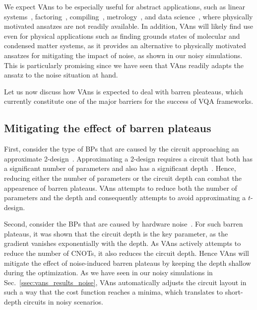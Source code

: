 We expect VAns to be especially useful for abstract applications, such as linear systems~\cite{bravo2020variational,huang2019near,xu2019variational}, factoring~\cite{anschuetz2019variational}, compiling~\cite{khatri2019quantum,sharma2019noise}, metrology~\cite{beckey2020variational,koczor2020variational}, and data science~\cite{larose2019variational,cerezo2020variational,biamonte2017quantum,schuld2014quest,abbas2020power,verdon2019quantum}, where physically motivated ansatzes are not readily available. In addition, VAns will likely find use even for physical applications such as finding grounds states of molecular and condensed matter systems, as it provides an alternative to physically motivated ansatzes for mitigating the impact of noise, as shown in our noisy simulations. This is particularly promising since we have seen that VAns readily adapts the ansatz to the noise situation at hand.

Let us now discuss how VAns is expected to deal with barren pleateaus, which currently constitute one of the major barriers for the success of VQA frameworks.

\subsection{Mitigating the effect of barren plateaus}
First, consider the type of BPs that are caused by the circuit approaching an approximate 2-design~\cite{mcclean2018barren}. Approximating a 2-design requires a circuit that both has a significant number of parameters and also has a significant depth~\cite{brandao2016local,dankert2009exact,harrow2009random,harrow2018approximate,haferkamp2022randomquantum}. Hence, reducing either the number of parameters or the circuit depth can combat the appearence of barren plateaus. VAns attempts to reduce both the number of parameters and the depth and consequently attempts to avoid approximating a $t$-design.

Second, consider the BPs that are caused by hardware noise~\cite{wang2020noise}. For such barren plateaus, it was shown that the circuit depth is the key parameter, as the gradient vanishes exponentially with the depth. As VAns actively attempts to reduce the number of CNOTs, it also reduces the circuit depth. Hence VAns will mitigate the effect of noise-induced barren plateaus by keeping the depth shallow during the optimization. As we have seen in our noisy simulations in Sec.~\ref{ssec:vans_results_noise}, VAns automatically adjusts the circuit layout in such a way that the cost function reaches a minima, which translates to short-depth circuits in noisy scenarios.

